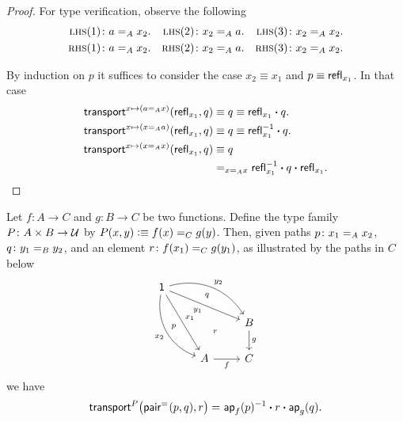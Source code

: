 \begin{proof} For type verification, observe the following
        \begin{align*}
            \lhs(1)&\colon a\eq Ax_2.
            &\lhs(2)&\colon x_2\eq Aa.
            &\lhs(3)&\colon x_2\eq Ax_2.\\
            \rhs(1)&\colon a\eq Ax_2.
            &\rhs(2)&\colon x_2\eq Aa.
            &\rhs(3)&\colon x_2\eq Ax_2.
        \end{align*}
    
    By induction on $p$ it suffices to consider the case $x_2\equiv x_1$ and $p\equiv\mathsf{refl}_{x_1}$. In that case
    \begin{align*}
        \mathsf{transport}^{x\mapsto(a\mathrel{=_{A}}x)}(\mathsf{refl}_{x_1},q)
            &\equiv q
            \equiv\mathsf{refl}_{x_1}\mathbin{\boldsymbol{\cdot}} q.\\
        \mathsf{transport}^{x\mapsto(x\mathrel{=_{A}}a)}(\mathsf{refl}_{x_1},q)
            &\equiv q
            \equiv\mathsf{refl}_{x_1}^{-1}\mathbin{\boldsymbol{\cdot}} q.\\
        \mathsf{transport}^{x\mapsto(x\mathrel{=_{A}}x)}(\mathsf{refl}_{x_1},q)
            &\equiv q\\
            &\mathrel{=_{x\mathrel{=_{A}}x}}\mathsf{refl}_{x_1}^{-1}
                \mathbin{\boldsymbol{\cdot}} q
                \mathbin{\boldsymbol{\cdot}}\mathsf{refl}_{x_1}.
    \end{align*}
\end{proof}

\begin{thm}\label{thm:transport-in-function-intersection}
    Let\/ $f\colon A\to C$ and\/ $g\colon B\to C$ be two functions. Define the type family\/ $P\colon A\times B\to\univ$ by\/ $P(x,y)\mathrel{\vcentcolon}\equiv f(x)\mathrel{=_{C}}g(y)$. Then, given paths\/ $p\colon x_1\eq{A}x_2$,\/ $q\colon y_1\eq{B}y_2$, and an element\/ $r\colon f(x_1)\eq{C}g(y_1)$, as illustrated by the paths in\/ $C$ below
    \[
        \begin{tikzcd}
            \fun1
                    \arrow[rdd,"x_1"]
                    \arrow[rrd,"y_1"']
                    \arrow[rdd,"x_2"',bend right=40]
                    \arrow[rrd,"y_2",bend left=36]
                    \arrow[rrdd,
                        "\scriptstyle r",
                        phantom,
                        description,
                        pos=0.65]
                    \arrow[rdd,
                        "\scriptstyle p",
                        phantom,
                        description,
                        bend right=20,
                        pos=0.5]
                    \arrow[rrd,
                        "\scriptstyle q",
                        phantom,
                        description,
                        bend left=18,
                        pos=0.5]\\
                &&B
                    \arrow[d,"g"]\\
                &A
                    \arrow[r,"f"']
                &C
        \end{tikzcd}
    \]
    we have
    \[
        \mathsf{transport}^P\bigl(\mathsf{pair}^{\mathrel{=_{}}}(p,q),r\bigr)
            \mathrel{=_{}}\mathsf{ap}_f(p)^{-1}\mathbin{\boldsymbol{\cdot}} r\mathbin{\boldsymbol{\cdot}}\mathsf{ap}_g(q).
    \]
\end{thm}


